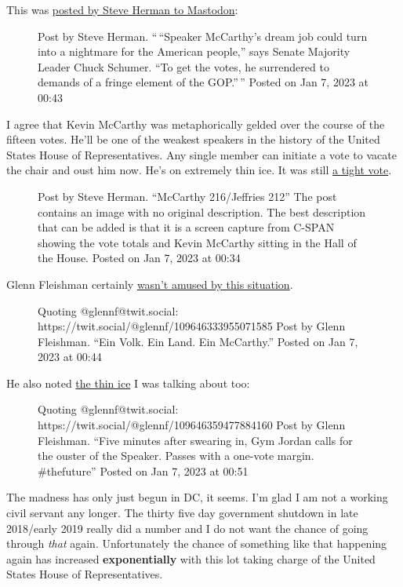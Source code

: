 This was
\href{https://mas.to/@w7voa@journa.host/109646330206886889}{posted by
Steve Herman to Mastodon}:

\begin{figure}
\centering
{}
\caption{Post by Steve Herman. ``\,``Speaker McCarthy's dream job could
turn into a nightmare for the American people,'' says Senate Majority
Leader Chuck Schumer. ``To get the votes, he surrendered to demands of a
fringe element of the GOP.''\,'' Posted on Jan 7, 2023 at 00:43}
\end{figure}

I agree that Kevin McCarthy was metaphorically gelded over the course of
the fifteen votes. He'll be one of the weakest speakers in the history
of the United States House of Representatives. Any single member can
initiate a vote to vacate the chair and oust him now. He's on extremely
thin ice. It was still
\href{https://mas.to/@w7voa@journa.host/109646292394939238}{a tight
vote}.

\begin{figure}
\centering
{}
\caption{Post by Steve Herman. ``McCarthy 216/Jeffries 212'' The post
contains an image with no original description. The best description
that can be added is that it is a screen capture from C-SPAN showing the
vote totals and Kevin McCarthy sitting in the Hall of the House. Posted
on Jan 7, 2023 at 00:34}
\end{figure}

Glenn Fleishman certainly
\href{https://twit.social/@glennf/109646333955071585}{wasn't amused by
this situation}.

\begin{figure}
\centering
{}
\caption{Quoting @glennf@twit.social:
https://twit.social/@glennf/109646333955071585 Post by Glenn Fleishman.
``Ein Volk. Ein Land. Ein McCarthy.'' Posted on Jan 7, 2023 at 00:44}
\end{figure}

He also noted \href{https://twit.social/@glennf/109646359477884160}{the
thin ice} I was talking about too:

\begin{figure}
\centering
{}
\caption{Quoting @glennf@twit.social:
https://twit.social/@glennf/109646359477884160 Post by Glenn Fleishman.
``Five minutes after swearing in, Gym Jordan calls for the ouster of the
Speaker. Passes with a one-vote margin. \#thefuture'' Posted on Jan 7,
2023 at 00:51}
\end{figure}

The madness has only just begun in DC, it seems. I'm glad I am not a
working civil servant any longer. The thirty five day government
shutdown in late 2018/early 2019 really did a number and I do not want
the chance of going through \emph{that} again. Unfortunately the chance
of something like that happening again has increased
\textbf{exponentially} with this lot taking charge of the United States
House of Representatives.
